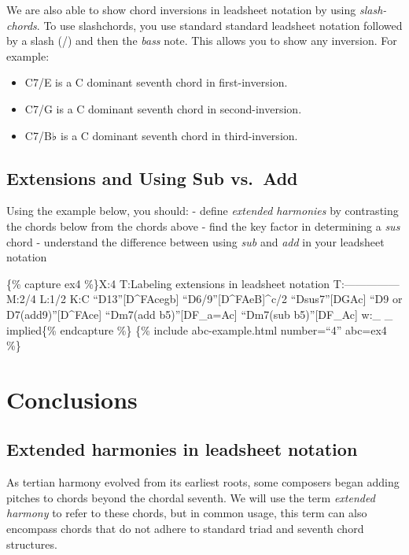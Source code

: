 \documentclass{book}
\providecommand{\tightlist}{%
  \setlength{\itemsep}{0pt}\setlength{\parskip}{0pt}}
\begin{document}
We are also able to show chord inversions in leadsheet notation by using
\emph{slash-chords}. To use slashchords, you use standard standard leadsheet
notation followed by a slash (/) and then the \emph{bass} note. This allows
you to show any inversion. For example:

\begin{itemize}
\tightlist
\item
  C7/E is a C dominant seventh chord in first-inversion.
\item
  C7/G is a C dominant seventh chord in second-inversion.
\item
  C7/B♭ is a C dominant seventh chord in third-inversion.
\end{itemize}

\hypertarget{extensions-and-using-sub-vs.-add}{%
\subsection{Extensions and Using Sub
vs.~Add}\label{extensions-and-using-sub-vs.-add}}

Using the example below, you should: - define \emph{extended harmonies} by
contrasting the chords below from the chords above - find the key factor in
determining a \emph{sus} chord - understand the difference between using
\emph{sub} and \emph{add} in your leadsheet notation

\{\% capture ex4 \%\}X:4 T:Labeling extensions in leadsheet notation
T:--------------- M:2/4 L:1/2 K:C ``D13''{[}D\^{}FAcegb{]}\textbar{}
``D6/9''{[}D\^{}FAeB{]}\^{}c/2\textbar{} ``Dsus7''{[}DGAc{]}\textbar{} ``D9 or
D7(add9)''{[}D\^{}FAce{]}\textbar{} ``Dm7(add b5)''{[}DF\_a=Ac{]}\textbar{}
``Dm7(sub b5)''{[}DF\_Ac{]}\textbar\textbar{} w:\_ \_ implied\{\% endcapture
\%\} \{\% include abc-example.html number=``4'' abc=ex4 \%\}

\hypertarget{conclusions-60}{%
\section{Conclusions}\label{conclusions-60}}

\hypertarget{extended-harmonies-in-leadsheet-notation}{%
\subsection{Extended harmonies in leadsheet
notation}\label{extended-harmonies-in-leadsheet-notation}}

As tertian harmony evolved from its earliest roots, some composers began
adding pitches to chords beyond the chordal seventh. We will use the term
\emph{extended harmony} to refer to these chords, but in common usage, this
term can also encompass chords that do not adhere to standard triad and
seventh chord structures.
\end{document}
